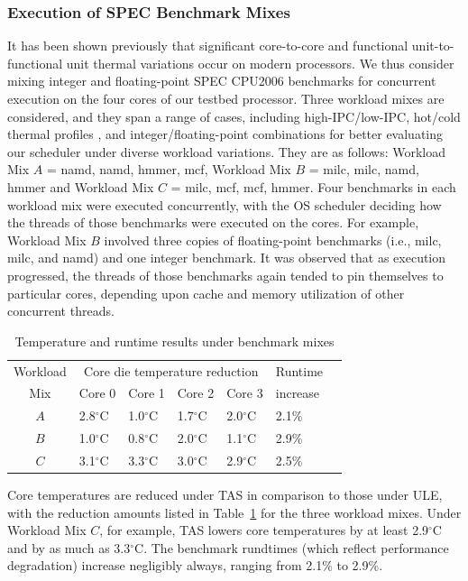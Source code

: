 \documentclass[times, 10pt,twocolumn]{IEEEtran}
\begin{document}
\subsubsection{Execution of SPEC Benchmark Mixes}
\label{sec:cross-funct-unit} 
It has been shown previously \cite{Choi2007,Cher2011} that significant
core-to-core and functional unit-to-functional unit thermal variations
occur on modern processors.  We thus consider mixing integer and
floating-point SPEC CPU2006 benchmarks for concurrent execution on the
four cores of our testbed processor.  Three workload mixes are
considered, and they span a range of cases, including high-IPC/low-IPC,
hot/cold thermal profiles \cite{Kursun2008}, and integer/floating-point
combinations for better evaluating our scheduler under diverse workload
variations.  They are as follows: Workload Mix $A$ = {namd, namd, hmmer,
  mcf}, Workload Mix $B$ = {milc, milc, namd, hmmer} and Workload Mix
$C$ = {milc, mcf, mcf, hmmer}.  Four benchmarks in each workload mix
were executed concurrently, with the OS scheduler deciding how the
threads of those benchmarks were executed on the cores.  For example,
Workload Mix $B$ involved three copies of floating-point benchmarks
(i.e., milc, milc, and namd) and one integer benchmark.  It was observed
that as execution progressed, the threads of those benchmarks again
tended to pin themselves to particular cores, depending upon cache and
memory utilization of other concurrent threads.

\begin{small}
\begin{table}[!bp] 
\centering
\caption{Temperature and runtime results under benchmark mixes}
\label{tab:mixwkload}
\begin{tabular}{cllllll} 
\hline
\hline
Workload & \multicolumn{4}{c}{Core die temperature reduction} & Runtime\\
 Mix & Core 0 & Core 1 & Core 2  & Core 3 & increase \\
\hline
$A$ & 2.8$^{\circ}$C & 1.0$^{\circ}$C & 1.7$^{\circ}$C & 2.0$^{\circ}$C & 2.1\% \\
$B$ & 1.0$^{\circ}$C & 0.8$^{\circ}$C & 2.0$^{\circ}$C & 1.1$^{\circ}$C & 2.9\% \\
$C$ & 3.1$^{\circ}$C & 3.3$^{\circ}$C & 3.0$^{\circ}$C & 2.9$^{\circ}$C & 2.5\% \\
\hline
\end{tabular}
\end{table}
\end{small} 

Core temperatures are reduced under TAS in comparison to those under ULE, with the
reduction amounts listed in Table~\ref{tab:mixwkload} for the three
workload mixes.  Under Workload Mix $C$, for example, TAS lowers core temperatures
by at least 2.9$^{\circ}$C and by as much as 3.3$^{\circ}$C.  
The benchmark rundtimes (which reflect performance degradation) increase
negligibly always, ranging from 2.1\% to 2.9\%.
\end{document}

